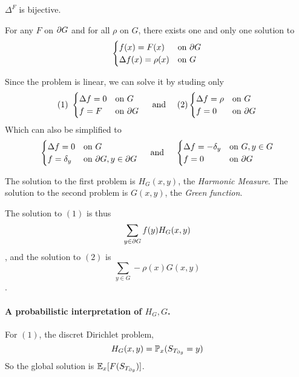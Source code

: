     \begin{proposition}
        $\Delta^F$ is bijective.
    \end{proposition}

    \begin{theorem}
        For any $F$ on $\partial G$ and for all $\rho$ on $G$, 
        there exists one and only one solution to 
        \[ 
            \begin{cases}
                f(x) = F(x) & \text{on } \partial G \\
                \Delta f(x) = \rho(x) & \text{on } G \\
            \end{cases}
        \]
    \end{theorem}

    Since the problem is linear, we can solve it by studing only
    \[
        (1)~\begin{cases}
            \Delta f = 0 & \text{on } G \\
            f = F        & \text{on } \d G
        \end{cases}
        \andquad
        (2) \begin{cases}
            \Delta f = \rho & \text{on } G \\
            f = 0           & \text{on } \d G
        \end{cases}
    \]
    Which can also be simplified to 
    \[
        \begin{cases}
            \Delta f = 0 & \text{on } G \\
            f = \delta_y & \text{on } \d G, y \in \d G
        \end{cases}
        \andquad
        \begin{cases}
            \Delta f = -\delta_y & \text{on } G, y \in G \\
            f = 0           & \text{on } \d G
        \end{cases}
    \]

    The solution to the first problem is $H_G(x, y)$, 
    the \emph{Harmonic Measure}.
    The solution to the second problem is $G(x, y)$,
    the \emph{Green function}.

    The solution to $(1)$ is thus \[
        \sum_{y \in \partial G} f(y)H_G(x, y)
    \],
    and the solution to $(2)$ is \[
        \sum_{y \in G} -\rho(x)G(x, y)
    \].

    \paragraph{A probabilistic interpretation of $H_G, G$.}
    For $(1)$, the discret Dirichlet problem,
    \[
        H_G(x, y) = \mathbb P_x(S_{T_{\partial g}} = y)
    \]
    So the global solution is $\mathbb{E}_x[F(S_{T_{\partial g}})]$.

